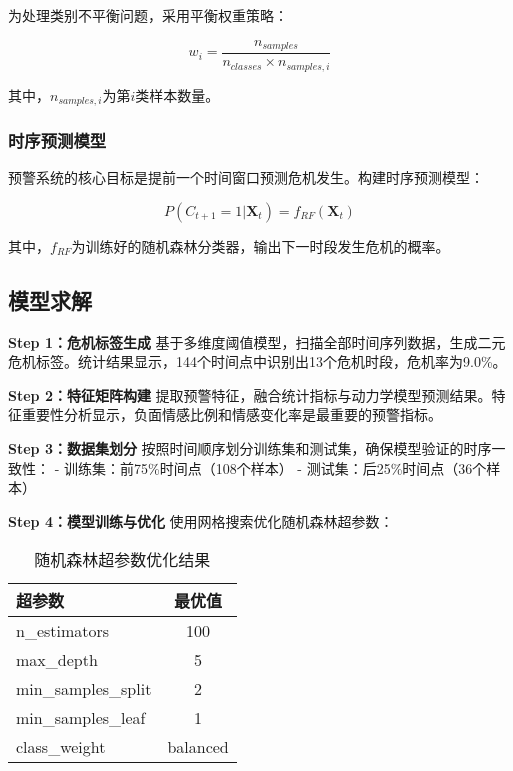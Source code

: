 \documentclass[withoutpreface,bwprint]{cumcmthesis}
\begin{document}
为处理类别不平衡问题，采用平衡权重策略：

\begin{equation}
\label{eq:class_weights}
w_i = \frac{n_{samples}}{n_{classes} \times n_{samples,i}}
\end{equation}

其中，$n_{samples,i}$为第$i$类样本数量。

\subsubsection{时序预测模型}

预警系统的核心目标是提前一个时间窗口预测危机发生。构建时序预测模型：

\begin{equation}
\label{eq:temporal_prediction}
P(C_{t+1} = 1 | \mathbf{X}_t) = f_{RF}(\mathbf{X}_t)
\end{equation}

其中，$f_{RF}$为训练好的随机森林分类器，输出下一时段发生危机的概率。

\subsection{模型求解}

\textbf{Step 1：危机标签生成}
基于多维度阈值模型，扫描全部时间序列数据，生成二元危机标签。统计结果显示，144个时间点中识别出13个危机时段，危机率为9.0\%。

\textbf{Step 2：特征矩阵构建}
提取预警特征，融合统计指标与动力学模型预测结果。特征重要性分析显示，负面情感比例和情感变化率是最重要的预警指标。

\textbf{Step 3：数据集划分}
按照时间顺序划分训练集和测试集，确保模型验证的时序一致性：
- 训练集：前75\%时间点（108个样本）
- 测试集：后25\%时间点（36个样本）

\textbf{Step 4：模型训练与优化}
使用网格搜索优化随机森林超参数：

\begin{table}[H]
\centering
\begin{tabularx}{\textwidth}{LC}
\toprule
超参数 & 最优值 \\
\midrule
n\_estimators & 100 \\
max\_depth & 5 \\
min\_samples\_split & 2 \\
min\_samples\_leaf & 1 \\
class\_weight & balanced \\
\bottomrule
\end{tabularx}
\caption{随机森林超参数优化结果}
\label{tab:rf_hyperparams}
\end{table}
\end{document}

